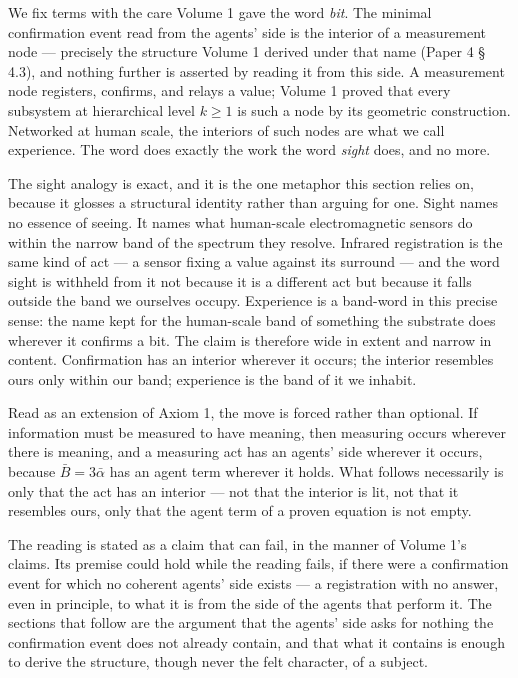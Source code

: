 \documentclass[11pt,oneside]{report}
\theoremstyle{definition}
\theoremstyle{remark}
\begin{document}
We fix terms with the care Volume 1 gave the word \emph{bit}. The minimal
confirmation event read from the agents' side is the interior of a
measurement node --- precisely the structure Volume 1 derived under that
name (Paper 4 \S\,4.3), and nothing further is asserted by reading it
from this side. A measurement node registers, confirms, and relays a
value; Volume 1 proved that every subsystem at hierarchical level
\ensuremath{k \geq 1} is such a node by its geometric construction.
Networked at human scale, the interiors of such nodes are what we call
experience. The word does exactly the work the word \emph{sight} does,
and no more.

The sight analogy is exact, and it is the one metaphor this section
relies on, because it glosses a structural identity rather than arguing
for one. Sight names no essence of seeing. It names what human-scale
electromagnetic sensors do within the narrow band of the spectrum they
resolve. Infrared registration is the same kind of act --- a sensor
fixing a value against its surround --- and the word sight is withheld
from it not because it is a different act but because it falls outside the
band we ourselves occupy. Experience is a band-word in this precise
sense: the name kept for the human-scale band of something the substrate
does wherever it confirms a bit. The claim is therefore wide in extent
and narrow in content. Confirmation has an interior wherever it occurs;
the interior resembles ours only within our band; experience is the band
of it we inhabit.

Read as an extension of Axiom 1, the move is forced rather than optional.
If information must be measured to have meaning, then measuring occurs
wherever there is meaning, and a measuring act has an agents' side
wherever it occurs, because \ensuremath{\bar{B} = 3\bar{\alpha}} has an
agent term wherever it holds. What follows necessarily is only that the
act has an interior --- not that the interior is lit, not that it
resembles ours, only that the agent term of a proven equation is not
empty.

The reading is stated as a claim that can fail, in the manner of Volume
1's claims. Its premise could hold while the reading fails, if there were
a confirmation event for which no coherent agents' side exists --- a
registration with no answer, even in principle, to what it is from the
side of the agents that perform it. The sections that follow are the
argument that the agents' side asks for nothing the confirmation event
does not already contain, and that what it contains is enough to derive
the structure, though never the felt character, of a subject.
\end{document}
